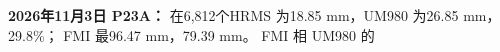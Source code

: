 \documentclass[11pt,a4paper]{article}
\numberwithin{equation}{section}
\numberwithin{figure}{section}
\begin{document}
\textbf{2026{\cjkfont 年}\allowbreak{}11{\cjkfont 月}\allowbreak{}3{\cjkfont 日}\allowbreak{} P23A{\cjkfont ：}\allowbreak{}} {\cjkfont 在}\allowbreak{}6,812{\cjkfont 个}\allowbreak{}HRMS {\cjkfont 为}\allowbreak{}18.85 mm{\cjkfont ，}\allowbreak{}UM980 {\cjkfont 为}\allowbreak{}26.85 mm{\cjkfont ，}\allowbreak{}29.8\%{\cjkfont ；}\allowbreak{} FMI {\cjkfont 最}\allowbreak{}96.47 mm{\cjkfont ，}\allowbreak{}79.39 mm{\cjkfont 。}\allowbreak{} FMI {\cjkfont 相}\allowbreak{} UM980 {\cjkfont 的}\allowbreak{}
\end{document}
